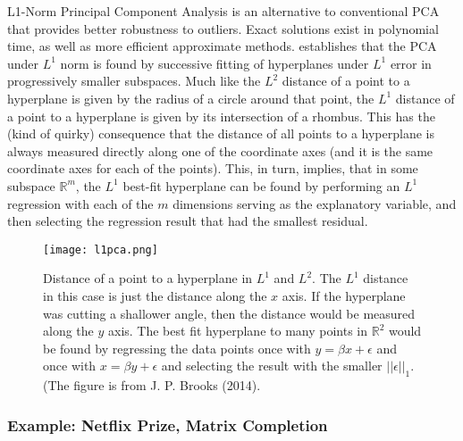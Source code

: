 L1-Norm Principal Component Analysis is an alternative to conventional PCA that provides better robustness to outliers. Exact solutions exist in polynomial time, as well as more efficient approximate methods.  establishes that the PCA under $L^1$ norm is found by successive fitting of hyperplanes under $L^1$ error in progressively smaller subspaces. Much like the $L^2$ distance of a point to a hyperplane is given by the radius of a circle around that point, the $L^1$ distance of a point to a hyperplane is given by its intersection of a rhombus. This has the (kind of quirky) consequence that the distance of all points to a hyperplane is always measured directly along one of the coordinate axes (and it is the same coordinate axes for each of the points). This, in turn, implies, that in some subspace $\mathbb{R}^m$, the $L^1$ best-fit hyperplane can be found by performing an $L^1$ regression with each of the $m$ dimensions serving as the explanatory variable, and then selecting the regression result that had the smallest residual.

\begin{figure}
\centering
    \texttt{[image: l1pca.png]}
    \caption{Distance of a point to a hyperplane in $L^1$ and $L^2$. The $L^1$ distance in this case is just the distance along the $x$ axis. If the hyperplane was cutting a shallower angle, then the distance would be measured along the $y$ axis. The best fit hyperplane to many points in $\mathbb{R}^2$ would be found by regressing the data points once with $y = \beta x + \epsilon$ and once with $x = \beta y + \epsilon$ and selecting the result with the smaller $||\epsilon||_1$. (The figure is from J. P. Brooks (2014).}
    \label{fig:l1pca}
\end{figure}


\subsubsection{Example: Netflix Prize, Matrix Completion}
